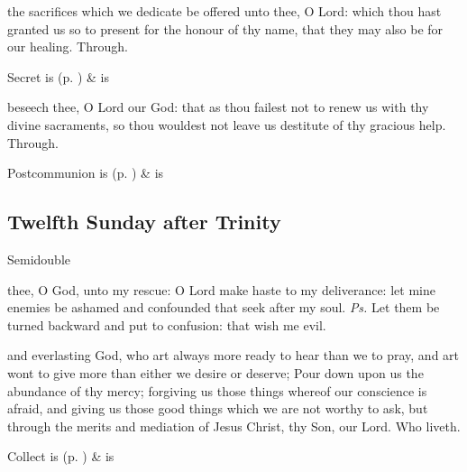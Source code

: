 \secret
{} the sacrifices which we dedicate be offered unto thee, O Lord: which thou hast granted us so to present for the honour of thy name, that they may also be for our healing. Through.
\begin{rubric}
     Secret is  (p. \pageref{SPSaints}) \&  is 
\end{rubric}


\postcommunion
{} beseech thee, O Lord our God: that as thou failest not to renew us with thy divine sacraments, so thou wouldest not leave us destitute of thy gracious help. Through.
\begin{rubric}
     Postcommunion is  (p. \pageref{SPSaints}) \&  is 
\end{rubric}


\clearpage
\subsection{Twelfth Sunday after Trinity}
\begin{inhead}
{Semidouble}
\end{inhead}


\introit
{} thee, O God, unto my rescue: O Lord make haste to my deliverance: let mine enemies be ashamed and confounded that seek after my soul. \textit{Ps.} Let them be turned backward and put to confusion: that wish me evil.

\collect
{} and everlasting God, who art always more ready to hear than we to pray, and art wont to give more than either we desire or deserve; Pour down upon us the abundance of thy mercy; forgiving us those things whereof our conscience is afraid, and giving us those good things which we are not worthy to ask, but through the merits and mediation of Jesus Christ, thy Son, our Lord. Who liveth.
\begin{rubric}
     Collect is  (p. \pageref{SPSaints}) \&  is 
\end{rubric}

